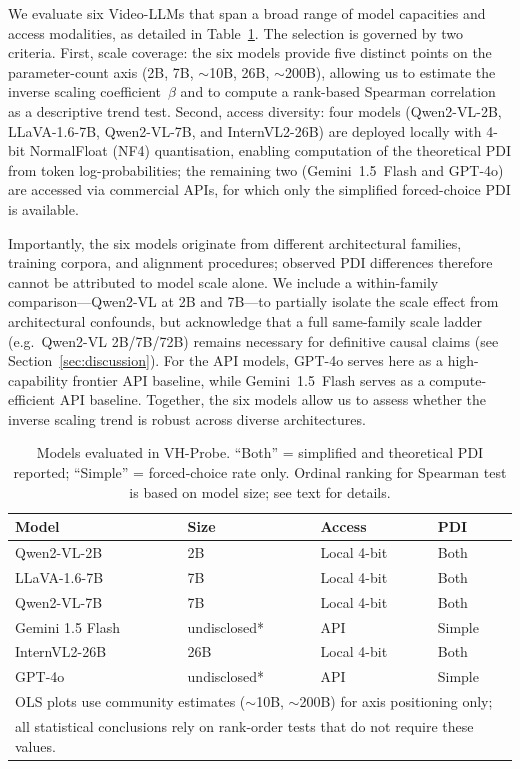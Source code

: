\documentclass[final,5p,times,twocolumn]{elsarticle}
\newcommand{\PDI}{\mathrm{PDI}}
\begin{document}
We evaluate six Video-LLMs that span a broad range of model capacities
and access modalities, as detailed in Table~\ref{tab:models}. The
selection is governed by two criteria. First, scale coverage:
the six models provide five distinct points on the parameter-count
axis (2B, 7B, ${\sim}$10B, 26B, ${\sim}$200B), allowing us to estimate
the inverse scaling coefficient~$\beta$ and to compute a rank-based
Spearman correlation as a descriptive trend test.
Second, access diversity: four models (Qwen2-VL-2B,
LLaVA-1.6-7B, Qwen2-VL-7B, and InternVL2-26B) are deployed locally
with 4-bit NormalFloat (NF4) quantisation, enabling computation of the theoretical
$\PDI$ from token log-probabilities; the remaining two
(Gemini~1.5~Flash and GPT-4o) are accessed via commercial APIs, for
which only the simplified forced-choice $\PDI$ is available.

Importantly, the six models originate from different architectural
families, training corpora, and alignment procedures; observed PDI
differences therefore cannot be attributed to model scale alone. We
include a within-family comparison---Qwen2-VL at 2B and 7B---to
partially isolate the scale effect from architectural confounds, but
acknowledge that a full same-family scale ladder (e.g.\
Qwen2-VL 2B/7B/72B) remains necessary for definitive causal claims
(see Section~\ref{sec:discussion}).
For the API models, GPT-4o serves here as a high-capability frontier
API baseline, while Gemini~1.5~Flash serves as a compute-efficient API
baseline. Together, the six models allow
us to assess whether the inverse scaling trend is robust across
diverse architectures.

\begin{table}[t]
\centering
\small
\caption{Models evaluated in VH-Probe. ``Both'' = simplified and
theoretical PDI reported; ``Simple'' = forced-choice rate only.
Ordinal ranking for Spearman test is based on model size; see text for
details.}
\label{tab:models}
\begin{tabular}{llll}
\toprule
\textbf{Model} & \textbf{Size} & \textbf{Access} & \textbf{PDI} \\
\midrule
Qwen2-VL-2B  & 2B   & Local 4-bit & Both \\
LLaVA-1.6-7B  & 7B   & Local 4-bit & Both \\
Qwen2-VL-7B  & 7B   & Local 4-bit & Both \\
Gemini 1.5 Flash & undisclosed* & API   & Simple \\
InternVL2-26B  & 26B   & Local 4-bit & Both \\
GPT-4o    & undisclosed* & API   & Simple \\
\bottomrule
\multicolumn{4}{l}{\scriptsize *OLS plots use community estimates
(${\sim}$10B, ${\sim}$200B) for axis positioning only;}\\
\multicolumn{4}{l}{\scriptsize \phantom{*}all statistical conclusions
rely on rank-order tests that do not require these values.}
\end{tabular}
\end{table}
\end{document}
